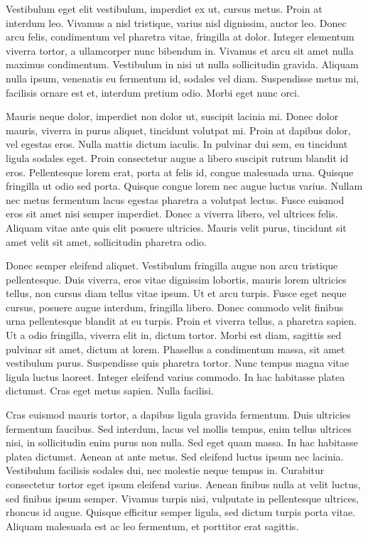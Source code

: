 Vestibulum eget elit vestibulum, imperdiet ex ut, cursus metus. Proin at interdum leo. Vivamus a nisl tristique, varius nisl dignissim, auctor leo. Donec arcu felis, condimentum vel pharetra vitae, fringilla at dolor. Integer elementum viverra tortor, a ullamcorper nunc bibendum in. Vivamus et arcu sit amet nulla maximus condimentum. Vestibulum in nisi ut nulla sollicitudin gravida. Aliquam nulla ipsum, venenatis eu fermentum id, sodales vel diam. Suspendisse metus mi, facilisis ornare est et, interdum pretium odio. Morbi eget nunc orci.

Mauris neque dolor, imperdiet non dolor ut, suscipit lacinia mi. Donec dolor mauris, viverra in purus aliquet, tincidunt volutpat mi. Proin at dapibus dolor, vel egestas eros. Nulla mattis dictum iaculis. In pulvinar dui sem, eu tincidunt ligula sodales eget. Proin consectetur augue a libero suscipit rutrum blandit id eros. Pellentesque lorem erat, porta at felis id, congue malesuada urna. Quisque fringilla ut odio sed porta. Quisque congue lorem nec augue luctus varius. Nullam nec metus fermentum lacus egestas pharetra a volutpat lectus. Fusce euismod eros sit amet nisi semper imperdiet. Donec a viverra libero, vel ultrices felis. Aliquam vitae ante quis elit posuere ultricies. Mauris velit purus, tincidunt sit amet velit sit amet, sollicitudin pharetra odio.

Donec semper eleifend aliquet. Vestibulum fringilla augue non arcu tristique pellentesque. Duis viverra, eros vitae dignissim lobortis, mauris lorem ultricies tellus, non cursus diam tellus vitae ipsum. Ut et arcu turpis. Fusce eget neque cursus, posuere augue interdum, fringilla libero. Donec commodo velit finibus urna pellentesque blandit at eu turpis. Proin et viverra tellus, a pharetra sapien. Ut a odio fringilla, viverra elit in, dictum tortor. Morbi est diam, sagittis sed pulvinar sit amet, dictum at lorem. Phasellus a condimentum massa, sit amet vestibulum purus. Suspendisse quis pharetra tortor. Nunc tempus magna vitae ligula luctus laoreet. Integer eleifend varius commodo. In hac habitasse platea dictumst. Cras eget metus sapien. Nulla facilisi.

Cras euismod mauris tortor, a dapibus ligula gravida fermentum. Duis ultricies fermentum faucibus. Sed interdum, lacus vel mollis tempus, enim tellus ultrices nisi, in sollicitudin enim purus non nulla. Sed eget quam massa. In hac habitasse platea dictumst. Aenean at ante metus. Sed eleifend luctus ipsum nec lacinia. Vestibulum facilisis sodales dui, nec molestie neque tempus in. Curabitur consectetur tortor eget ipsum eleifend varius. Aenean finibus nulla at velit luctus, sed finibus ipsum semper. Vivamus turpis nisi, vulputate in pellentesque ultrices, rhoncus id augue. Quisque efficitur semper ligula, sed dictum turpis porta vitae. Aliquam malesuada est ac leo fermentum, et porttitor erat sagittis.

